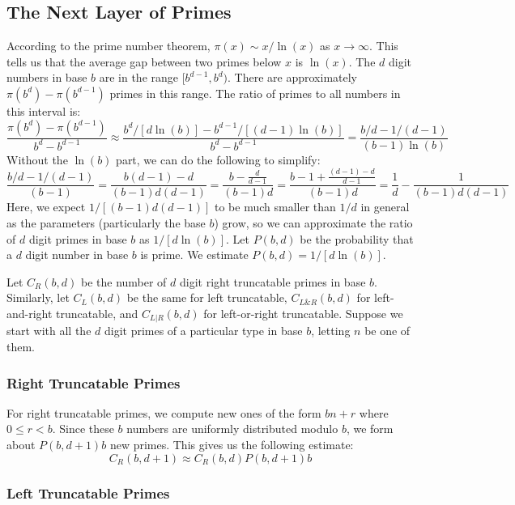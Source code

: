 \documentclass[12pt]{article}
\begin{document}
\subsection{The Next Layer of Primes}

According to the prime number theorem, $\pi(x)\sim x/\ln(x)$ as $x\to\infty$. This tells us that the average gap between two primes below $x$ is $\ln(x)$. The $d$ digit numbers in base $b$ are in the range $[b^{d-1},b^d)$. There are approximately $\pi(b^d)-\pi(b^{d-1})$ primes in this range. The ratio of primes to all numbers in this interval is:
\begin{equation}
\frac{\pi(b^d)-\pi(b^{d-1})}{b^d-b^{d-1}} \approx \frac{b^d/[d\ln(b)]-b^{d-1}/[(d-1)\ln(b)]}{b^d-b^{d-1}} = \frac{b/d-1/(d-1)}{(b-1)\ln(b)}
\end{equation}
Without the $\ln(b)$ part, we can do the following to simplify:
\begin{equation}
\frac{b/d-1/(d-1)}{(b-1)} = \frac{b(d-1)-d}{(b-1)d(d-1)} = \frac{b-\frac{d}{d-1}}{(b-1)d} = \frac{b-1+\frac{(d-1)-d}{d-1}}{(b-1)d} = \frac{1}{d}-\frac{1}{(b-1)d(d-1)}
\end{equation}
Here, we expect $1/[(b-1)d(d-1)]$ to be much smaller than $1/d$ in general as the parameters (particularly the base $b$) grow, so we can approximate the ratio of $d$ digit primes in base $b$ as $1/[d\ln(b)]$. Let $P(b,d)$ be the probability that a $d$ digit number in base $b$ is prime. We estimate $P(b,d)=1/[d\ln(b)]$.

Let $C_R(b,d)$ be the number of $d$ digit right truncatable primes in base $b$. Similarly, let $C_L(b,d)$ be the same for left truncatable, $C_{L\&R}(b,d)$ for left-and-right truncatable, and $C_{L|R}(b,d)$ for left-or-right truncatable. Suppose we start with all the $d$ digit primes of a particular type in base $b$, letting $n$ be one of them.

\subsubsection{Right Truncatable Primes}

For right truncatable primes, we compute new ones of the form $bn+r$ where $0\leq r<b$. Since these $b$ numbers are uniformly distributed modulo $b$, we form about $P(b,d+1)b$ new primes. This gives us the following estimate:
\begin{equation}
C_R(b,d+1) \approx C_R(b,d)P(b,d+1)b
\end{equation}

\subsubsection{Left Truncatable Primes}
\end{document}
